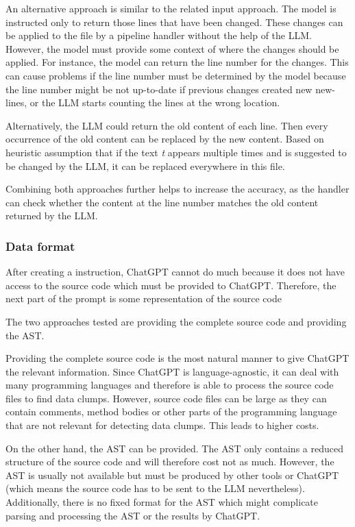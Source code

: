  An alternative approach is similar to the related input approach. The model is instructed only to return those lines that have been changed. These changes can be applied to the file by a pipeline handler without the help of the \ac{LLM}. However, the model must provide some context of where the changes should be applied. For instance, the model can return the line number for the changes. This can cause problems if the  line number must be determined by the model because the line number might be not up-to-date if previous changes created new new-lines, or the LLM starts counting the lines at the wrong location.

 Alternatively, the LLM could return the old content of each line. Then every occurrence of the old content can be replaced by the new content. Based on heuristic assumption that if the text \textit{t} appears multiple times and is suggested to be changed by the \ac{LLM}, it can be replaced everywhere in this file. 

 Combining both approaches further helps to increase the accuracy, as the handler can check whether the content at the line number matches the old content returned by the LLM.  
 

\subsubsection{Data format}

After creating a instruction, ChatGPT cannot do much because it does not have access to the source code which must be provided to ChatGPT. Therefore, the next part of the prompt is some representation of the source code

The two approaches tested are providing the complete source code and providing the \ac{AST}.

Providing the complete source code is the most natural manner to give ChatGPT the relevant information. Since ChatGPT is language-agnostic, it can deal with many programming languages and therefore is able to process the source code files to find data clumps. However, source code files can be large as they can contain comments, method bodies or other parts of the programming language that are not relevant for detecting data clumps. This leads to higher costs.

On the other hand, the \ac{AST} can be provided. The \ac{AST} only contains a reduced structure of the source code and will therefore cost not as much. However, the \ac{AST} is usually not available but must be produced by other tools or ChatGPT (which means the source code has to be sent to the \ac{LLM} nevertheless). Additionally, there is no fixed format for the \ac{AST} which might complicate parsing and processing the \ac{AST} or the results by ChatGPT.


